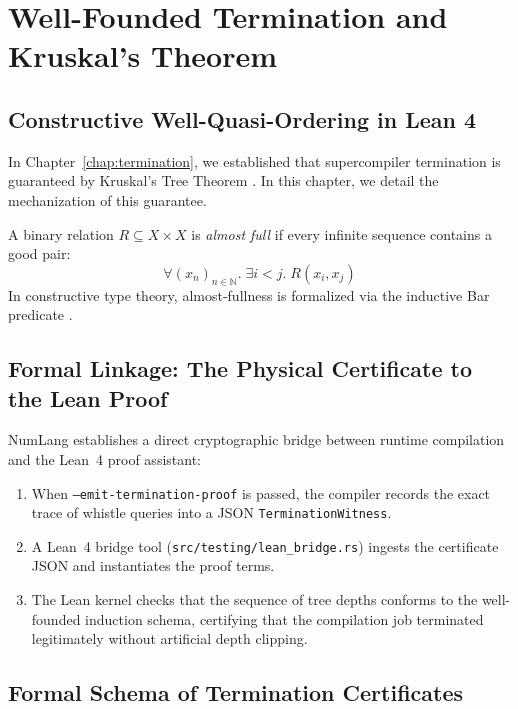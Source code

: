 \chapter{Well-Founded Termination and Kruskal's Theorem}
\label{chap:termination_proof}

\section{Constructive Well-Quasi-Ordering in Lean 4}
\label{sec:termination_proof:wqo}

In Chapter~\ref{chap:termination}, we established that supercompiler termination is guaranteed by Kruskal's Tree Theorem \citep{kruskal1960well}. In this chapter, we detail the mechanization of this guarantee.

A binary relation $R \subseteq X \times X$ is \emph{almost full} if every infinite sequence contains a good pair:
\begin{equation}
\forall (x_n)_{n \in \mathbb{N}}.\; \exists i < j.\; R(x_i, x_j)
\end{equation}
In constructive type theory, almost-fullness is formalized via the inductive Bar predicate \citep{coquand1993constructive}.

\section{Formal Linkage: The Physical Certificate to the Lean Proof}
\label{sec:termination_proof:certificate}

NumLang establishes a direct cryptographic bridge between runtime compilation and the Lean~4 proof assistant:
\begin{enumerate}
    \item When \texttt{--emit-termination-proof} is passed, the compiler records the exact trace of whistle queries into a JSON \texttt{TerminationWitness}.
    \item A Lean~4 bridge tool (\texttt{src/testing/lean\_bridge.rs}) ingests the certificate JSON and instantiates the proof terms.
    \item The Lean kernel checks that the sequence of tree depths conforms to the well-founded induction schema, certifying that the compilation job terminated legitimately without artificial depth clipping.
\end{enumerate}

\section{Formal Schema of Termination Certificates}
\label{sec:termination:schema}

